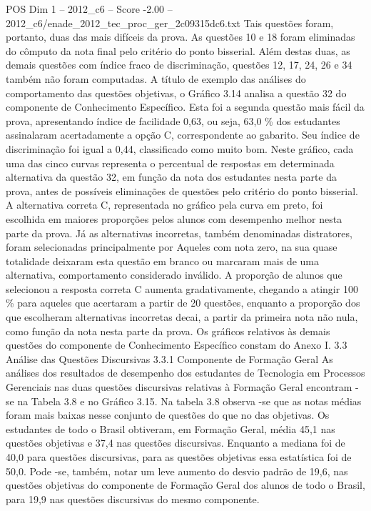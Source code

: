 \begin{textsample}{POS Dim 1 – 2012\_c6 – Score -2.00 – 2012\_c6/enade\_2012\_tec\_proc\_ger\_2c09315dc6.txt}
Tais questões foram, portanto, duas das mais difíceis da prova.
As questões 10 e 18 foram eliminadas do cômputo da nota final pelo critério do ponto bisserial.
Além destas duas, as demais questões com índice fraco de discriminação, questões 12, 17, 24, 26 e 34 também não foram computadas.
A título de exemplo das análises do comportamento das questões objetivas, o Gráfico 3.14 analisa a questão 32 do componente de Conhecimento Específico.
Esta foi a segunda questão mais fácil da prova, apresentando índice de facilidade 0,63, ou seja, 63,0 \% dos estudantes assinalaram acertadamente a opção C, correspondente ao gabarito.
Seu índice de discriminação foi igual a 0,44, classificado como muito bom.
Neste gráfico, cada uma das cinco curvas representa o percentual de respostas em determinada alternativa da questão 32, em função da nota dos estudantes nesta parte da prova, antes de possíveis eliminações de questões pelo critério do ponto bisserial.
A alternativa correta C, representada no gráfico pela curva em preto, foi escolhida em maiores proporções pelos alunos com desempenho melhor nesta parte da prova.
Já as alternativas incorretas, também denominadas distratores, foram selecionadas principalmente por Aqueles com nota zero, na sua quase totalidade deixaram esta questão em branco ou marcaram mais de uma alternativa, comportamento considerado inválido.
A proporção de alunos que selecionou a resposta correta C aumenta gradativamente, chegando a atingir 100 \% para aqueles que acertaram a partir de 20 questões, enquanto a proporção dos que escolheram alternativas incorretas decai, a partir da primeira nota não nula, como função da nota nesta parte da prova.
Os gráficos relativos às demais questões do componente de Conhecimento Específico constam do Anexo I. 3.3 Análise das Questões Discursivas 3.3.1 Componente de Formação Geral As análises dos resultados de desempenho dos estudantes de Tecnologia em Processos Gerenciais nas duas questões discursivas relativas à Formação Geral encontram -se na Tabela 3.8 e no Gráfico 3.15.
Na tabela 3.8 observa -se que as notas médias foram mais baixas nesse conjunto de questões do que no das objetivas.
Os estudantes de todo o Brasil obtiveram, em Formação Geral, média 45,1 nas questões objetivas e 37,4 nas questões discursivas.
Enquanto a mediana foi de 40,0 para questões discursivas, para as questões objetivas essa estatística foi de 50,0.
Pode -se, também, notar um leve aumento do desvio padrão de 19,6, nas questões objetivas do componente de Formação Geral dos alunos de todo o Brasil, para 19,9 nas questões discursivas do mesmo componente.

\end{textsample}

